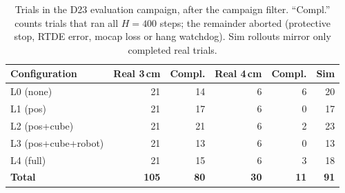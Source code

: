 \begin{table}[h]
\centering
\caption{Trials in the D23 evaluation campaign, after the campaign filter. \enquote{Compl.} counts trials that ran all $H=400$ steps; the remainder aborted (protective stop, RTDE error, mocap loss or hang watchdog). Sim rollouts mirror only completed real trials.}
\label{tab:dataset}
\begin{tabular}{lrrrrr}
\hline
\textbf{Configuration} & \textbf{Real 3\,cm} & \textbf{Compl.} & \textbf{Real 4\,cm} & \textbf{Compl.} & \textbf{Sim} \\
\hline
L0 (none) & 21 & 14 & 6 & 6 & 20 \\
L1 (pos) & 21 & 17 & 6 & 0 & 17 \\
L2 (pos+cube) & 21 & 21 & 6 & 2 & 23 \\
L3 (pos+cube+robot) & 21 & 13 & 6 & 0 & 13 \\
L4 (full) & 21 & 15 & 6 & 3 & 18 \\
\textbf{Total} & \textbf{105} & \textbf{80} & \textbf{30} & \textbf{11} & \textbf{91} \\
\hline
\end{tabular}
\end{table}
